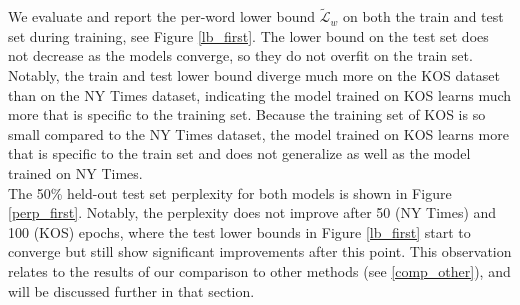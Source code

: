 \documentclass{report}
\begin{document}
	We evaluate and report the per-word lower bound $\tilde{\mathcal{L}}_w$ on both the train and test set during training, see Figure \ref{lb_first}. The lower bound on the test set does not decrease as the models converge, so they do not overfit on the train set. Notably, the train and test lower bound diverge much more on the KOS dataset than on the NY Times dataset, indicating the model trained on KOS learns much more that is specific to the training set. Because the training set of KOS is so small compared to the NY Times dataset, the model trained on KOS learns more that is specific to the train set and does not generalize as well as the model trained on NY Times. \\
	The 50\% held-out test set perplexity for both models is shown in Figure \ref{perp_first}. Notably, the perplexity does not improve after 50 (NY Times) and 100 (KOS) epochs, where the test lower bounds in Figure \ref{lb_first} start to converge but still show significant improvements after this point. This observation relates to the results of our comparison to other methods (see \ref{comp_other}), and will be discussed further in that section.
	
\end{document}
